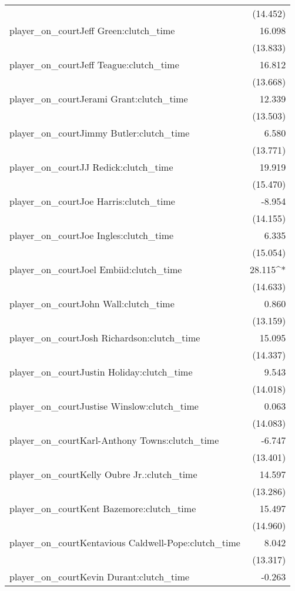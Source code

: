 \documentclass[
  landscape]{article}
\begin{document}
\begin{table}[!htbp]
\begin{tabular}{@{\extracolsep{5pt}}lD{.}{.}{-3} }
  & (14.452) \\ 
  player\_on\_courtJeff Green:clutch\_time & 16.098 \\ 
  & (13.833) \\ 
  player\_on\_courtJeff Teague:clutch\_time & 16.812 \\ 
  & (13.668) \\ 
  player\_on\_courtJerami Grant:clutch\_time & 12.339 \\ 
  & (13.503) \\ 
  player\_on\_courtJimmy Butler:clutch\_time & 6.580 \\ 
  & (13.771) \\ 
  player\_on\_courtJJ Redick:clutch\_time & 19.919 \\ 
  & (15.470) \\ 
  player\_on\_courtJoe Harris:clutch\_time & -8.954 \\ 
  & (14.155) \\ 
  player\_on\_courtJoe Ingles:clutch\_time & 6.335 \\ 
  & (15.054) \\ 
  player\_on\_courtJoel Embiid:clutch\_time & 28.115^{*} \\ 
  & (14.633) \\ 
  player\_on\_courtJohn Wall:clutch\_time & 0.860 \\ 
  & (13.159) \\ 
  player\_on\_courtJosh Richardson:clutch\_time & 15.095 \\ 
  & (14.337) \\ 
  player\_on\_courtJustin Holiday:clutch\_time & 9.543 \\ 
  & (14.018) \\ 
  player\_on\_courtJustise Winslow:clutch\_time & 0.063 \\ 
  & (14.083) \\ 
  player\_on\_courtKarl-Anthony Towns:clutch\_time & -6.747 \\ 
  & (13.401) \\ 
  player\_on\_courtKelly Oubre Jr.:clutch\_time & 14.597 \\ 
  & (13.286) \\ 
  player\_on\_courtKent Bazemore:clutch\_time & 15.497 \\ 
  & (14.960) \\ 
  player\_on\_courtKentavious Caldwell-Pope:clutch\_time & 8.042 \\ 
  & (13.317) \\ 
  player\_on\_courtKevin Durant:clutch\_time & -0.263 \\ 

\end{tabular}
\end{table}
\end{document}
